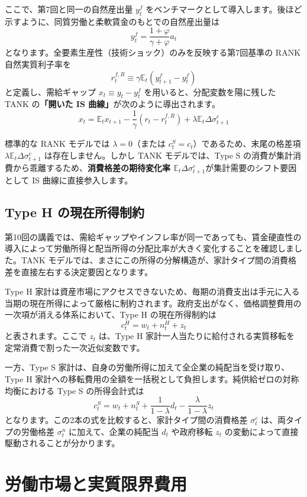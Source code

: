 \documentclass[
  japanese,
  lualatex,
  ja=standard,
  12pt,
  a4paper]{ltjsarticle}
\begin{document}
ここで、第7回と同一の自然産出量 \(y_t^f\)
をベンチマークとして導入します。後ほど示すように、同質労働と柔軟賃金のもとでの自然産出量は
\[
y_t^f = \frac{1+\varphi}{\gamma+\varphi} a_t
\] となります。全要素生産性（技術ショック）のみを反映する第7回基準の
RANK 自然実質利子率を \[
r_t^{f,R} \equiv \gamma \mathbb{E}_t (y_{t+1}^f - y_t^f)
\] と定義し、需給ギャップ \(x_t \equiv y_t - y_t^f\)
を用いると、分配変数を陽に残した TANK の\textbf{「開いた IS
曲線」}が次のように導出されます。 \[
x_t
=
\mathbb{E}_t x_{t+1}
-
\frac{1}{\gamma}(r_t - r_t^{f,R})
+
\lambda \mathbb{E}_t \Delta \sigma_{t+1}^c
\]

標準的な RANK モデルでは \(\lambda=0\)（または
\(c_t^S = c_t\)）であるため、末尾の格差項
\(\lambda \mathbb{E}_t \Delta \sigma_{t+1}^c\) は存在しません。しかし
TANK モデルでは、Type S
の消費が集計消費から乖離するため、\textbf{消費格差の期待変化率
\(\mathbb{E}_t \Delta \sigma_{t+1}^c\)}が集計需要のシフト要因として IS
曲線に直接参入します。

\subsection{Type H
の現在所得制約}\label{type-h-ux306eux73feux5728ux6240ux5f97ux5236ux7d04}

第10回の講義では、需給ギャップやインフレ率が同一であっても、賃金硬直性の導入によって労働所得と配当所得の分配比率が大きく変化することを確認しました。TANK
モデルでは、まさにこの所得の分解構造が、家計タイプ間の消費格差を直接左右する決定要因となります。


Type H
家計は資産市場にアクセスできないため、毎期の消費支出は手元に入る当期の現在所得によって厳格に制約されます。政府支出がなく、価格調整費用の一次項が消える体系において、Type
H の現在所得制約は \[
c_t^H = w_t + n_t^H + z_t
\] と表されます。ここで \(z_t\) は、Type H
家計一人当たりに給付される実質移転を定常消費で割った一次近似変数です。

一方、Type S
家計は、自身の労働所得に加えて全企業の純配当を受け取り、Type H
家計への移転費用の全額を一括税として負担します。純供給ゼロの対称均衡における
Type S の所得会計式は \[
c_t^S
=
w_t + n_t^S + \frac{1}{1-\lambda} d_t - \frac{\lambda}{1-\lambda} z_t
\] となります。この2本の式を比較すると、家計タイプ間の消費格差
\(\sigma_t^c\) は、両タイプの労働格差 \(\sigma_t^n\)
に加えて、企業の純配当 \(d_t\) や政府移転 \(z_t\)
の変動によって直接駆動されることが分かります。

\section{労働市場と実質限界費用}\label{ux52b4ux50cdux5e02ux5834ux3068ux5b9fux8ceaux9650ux754cux8cbbux7528}
\end{document}
